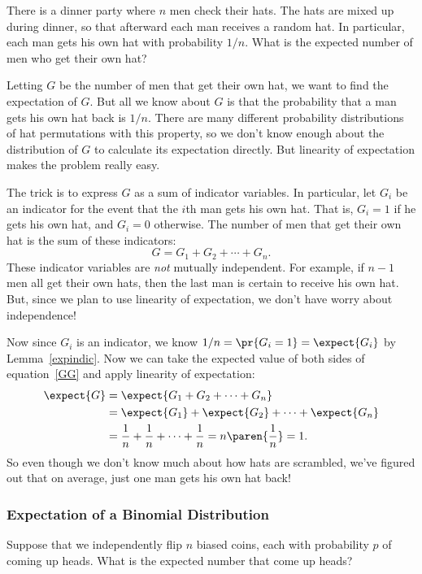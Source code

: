 There is a dinner party where $n$ men check their hats.  The hats are
mixed up during dinner, so that afterward each man receives a random hat.
In particular, each man gets his own hat with probability $1/n$.  What is
the expected number of men who get their own hat?

Letting $G$ be the number of men that get their own hat, we want to find
the expectation of $G$.  But all we know about $G$ is that the probability
that a man gets his own hat back is $1/n$.  There are many different
probability distributions of hat permutations with this property, so we
don't know enough about the distribution of $G$ to calculate its
expectation directly.  But linearity of expectation makes the problem
really easy.

The trick is to express $G$ as a sum of indicator variables.  In
particular, let $G_i$ be an indicator for the event that the $i$th man
gets his own hat.  That is, $G_i = 1$ if he gets his own hat, and $G_i =
0$ otherwise.  The number of men that get their own hat is the sum of
these indicators:
%
\begin{equation}\label{GG}
G = G_1 + G_2 + \cdots + G_n.
\end{equation}
%
These indicator variables are \textit{not} mutually independent.  For
example, if $n-1$ men all get their own hats, then the last man is
certain to receive his own hat.  But, since we plan to use linearity
of expectation, we don't have worry about independence!

Now since $G_i$ is an indicator, we know $1/n = \pr{G_i=1} = \expect{G_i}$
by Lemma~\ref{expindic}.  Now we can take the expected value of both sides
of equation~\eqref{GG} and apply linearity of expectation:
\begin{align*}
\expect{G} & = \expect{G_1 + G_2 + \cdots + G_n} \\
       & = \expect{G_1} + \expect{G_2} + \cdots + \expect{G_n}\\
       & = \frac{1}{n} + \frac{1}{n} + \cdots + \frac{1}{n} =
       n\paren{\frac{1}{n}} = 1.
\end{align*}
So even though we don't know much about how hats are scrambled, we've
figured out that on average, just one man gets his own hat back!


\subsubsection{Expectation of a Binomial Distribution}
Suppose that we independently flip $n$ biased coins, each with probability
$p$ of coming up heads.  What is the expected number that come up heads?


